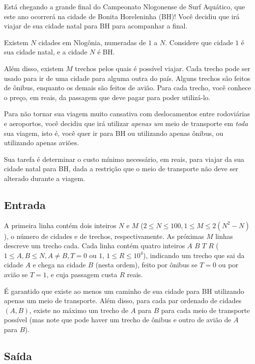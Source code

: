 Está chegando a grande final do Campeonato Nlogonense de Surf Aquático, que este
ano ocorrerá na cidade de Bonita Horeleninha (BH)! Você decidiu que
irá viajar de sua cidade natal para BH para acompanhar a final.

Existem $N$ cidades em Nlogônia, numeradas de $1$ a $N$. Considere que cidade
$1$ é sua cidade natal, e a cidade $N$ é BH.

Além disso, existem $M$ trechos pelos quais
é possível viajar. Cada trecho pode ser usado para ir de uma cidade para
alguma outra do país. Alguns trechos são feitos de ônibus, enquanto os demais são
feitos de avião. Para cada trecho, você conhece o preço, em reais, da passagem
que deve pagar para poder utilizá-lo.

Para não tornar sua viagem muito cansativa com deslocamentos entre
rodoviárias e aeroportos, você decidiu que irá utilizar \textit{apenas um} meio
de transporte em \textit{toda} sua viagem, isto é, você quer ir para BH
ou utilizando apenas ônibus, ou utilizando apenas aviões.

Sua tarefa é determinar o custo mínimo necessário, em reais, para viajar da sua
cidade natal para BH, dada a restrição que o meio de transporte não deve ser
alterado durante a viagem.

\subsection*{Entrada}

A primeira linha contém dois inteiros $N$ e $M$ ($2 \leq N \leq 100, 1 \leq M
\leq 2(N^2 - N)$), o número de cidades e de trechos, respectivamente. As próximas
$M$ linhas descreve um trecho cada. Cada linha contém quatro inteiros
$A$ $B$ $T$ $R$ ($1 \leq A, B \leq N, A \neq B, T=0$ ou $1$, $1 \leq R \leq 10^4$),
indicando um trecho que sai da cidade $A$ e chega na cidade $B$ (nesta ordem),
feito por ônibus se $T=0$ ou por avião se $T=1$, e cuja passagem custa $R$
reais.

É garantido que existe ao menos um caminho de sua cidade para BH utilizando
apenas um meio de transporte. Além disso, para cada par ordenado de cidades
$(A,B)$, existe no máximo um trecho de $A$ para $B$ para cada meio de transporte
possível (mas note que pode haver um trecho de ônibus e outro de
avião de $A$ para $B$).

\subsection*{Saída}

